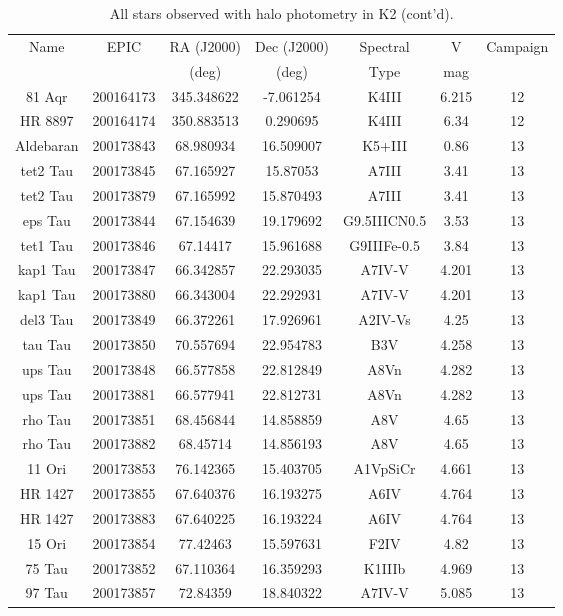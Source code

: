 \begin{table*}
\caption{All stars observed with halo photometry in K2 (cont'd).}
\begin{tabular}{ccccccc}
\hline \hline
Name & EPIC & RA (J2000) & Dec (J2000) & Spectral & V & Campaign \\
 &  & (deg) & (deg) & Type & mag &  \\
\hline
81 Aqr & 200164173 & 345.348622 & -7.061254 & K4III & 6.215 & 12 \\
HR 8897 & 200164174 & 350.883513 & 0.290695 & K4III & 6.34 & 12 \\
Aldebaran & 200173843 & 68.980934 & 16.509007 & K5+III & 0.86 & 13 \\
tet2 Tau & 200173845 & 67.165927 & 15.87053 & A7III & 3.41 & 13 \\
tet2 Tau & 200173879 & 67.165992 & 15.870493 & A7III & 3.41 & 13 \\
eps Tau & 200173844 & 67.154639 & 19.179692 & G9.5IIICN0.5 & 3.53 & 13 \\
tet1 Tau & 200173846 & 67.14417 & 15.961688 & G9IIIFe-0.5 & 3.84 & 13 \\
kap1 Tau & 200173847 & 66.342857 & 22.293035 & A7IV-V & 4.201 & 13 \\
kap1 Tau & 200173880 & 66.343004 & 22.292931 & A7IV-V & 4.201 & 13 \\
del3 Tau & 200173849 & 66.372261 & 17.926961 & A2IV-Vs & 4.25 & 13 \\
tau Tau & 200173850 & 70.557694 & 22.954783 & B3V & 4.258 & 13 \\
ups Tau & 200173848 & 66.577858 & 22.812849 & A8Vn & 4.282 & 13 \\
ups Tau & 200173881 & 66.577941 & 22.812731 & A8Vn & 4.282 & 13 \\
rho Tau & 200173851 & 68.456844 & 14.858859 & A8V & 4.65 & 13 \\
rho Tau & 200173882 & 68.45714 & 14.856193 & A8V & 4.65 & 13 \\
11 Ori & 200173853 & 76.142365 & 15.403705 & A1VpSiCr & 4.661 & 13 \\
HR 1427 & 200173855 & 67.640376 & 16.193275 & A6IV & 4.764 & 13 \\
HR 1427 & 200173883 & 67.640225 & 16.193224 & A6IV & 4.764 & 13 \\
15 Ori & 200173854 & 77.42463 & 15.597631 & F2IV & 4.82 & 13 \\
75 Tau & 200173852 & 67.110364 & 16.359293 & K1IIIb & 4.969 & 13 \\
97 Tau & 200173857 & 72.84359 & 18.840322 & A7IV-V & 5.085 & 13 \\

\end{tabular}
\end{table*}
